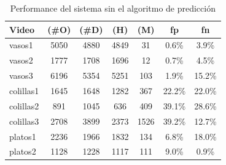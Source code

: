 \begin{table}[htb]
  \begin{tabular}{|l | c | c | c | c | c | c |}
	\hline  
	\textbf{Video} & \textbf{(\#O)} &  \textbf{(\#D)} & \textbf{(H)} & 
	\textbf{(M)} & \textbf{fp} & \textbf{fn}\\
	\hline
	\hline
	vasos1 & 5050 & 4880 & 4849 & 31 & 0.6\% & 3.9\% \\
	vasos2 & 1777 & 1708 & 1696 & 12 & 0.7\% & 4.5\% \\	
	vasos3 & 6196 & 5354 & 5251 & 103 & 1.9\% & 15.2\% \\
	\hline
	colillas1 & 1645 & 1648 & 1282 & 367 & 22.2\% & 22.0\% \\
	colillas2 & 891 & 1045 & 636 &  409 & 39.1\% & 28.6\% \\
	colillas3 & 2708 & 3899 & 2373 & 1526 & 39.2\% & 12.7\% \\
	\hline
	platos1 & 2236 & 1966 & 1832 & 134 & 6.8\% & 18.0\%\\
	platos2 & 1128 & 1228 & 1117 & 111& 9.0\% & 0.9\% \\
	\hline
	\end{tabular}
	\caption[Performance del algoritmo de visi\'on]{\label{tab:result} Performance del sistema sin el algoritmo de predicci\'on}
\end{table}


